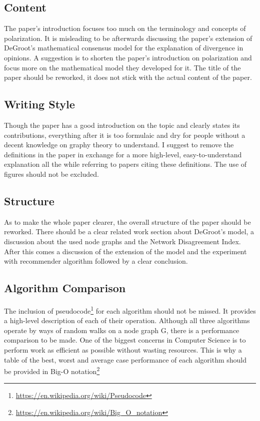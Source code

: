 \documentclass[14]{article}
\begin{document}
\subsection{Content}
The paper's introduction focuses too much on the terminology and concepts of polarization. It is misleading to be afterwards discussing the paper's extension of DeGroot's mathematical consensus model for the explanation of divergence in opinions. A suggestion is to shorten the paper's introduction on polarization and focus more on the mathematical model they developed for it. The title of the paper should be reworked, it does not stick with the actual content of the paper.

\subsection{Writing Style}
Though the paper has a good introduction on the topic and clearly states its contributions, everything after it is too formulaic and dry for people without a decent knowledge on graphy theory to understand. I suggest to remove the definitions in the paper in exchange for a more high-level, easy-to-understand explanation all the while referring to papers citing these definitions. The use of figures should not be excluded.

\subsection{Structure}
As to make the whole paper clearer, the overall structure of the paper should be reworked. There should be a clear related work section about DeGroot's model, a discussion about the used node graphs and the Network Disagreement Index. After this comes a discussion of the extension of the model and the experiment with recommender algorithm followed by a clear conclusion.

\subsection{Algorithm Comparison}
The inclusion of pseudocode\footnote{\protect\url{https://en.wikipedia.org/wiki/Pseudocode}} for each algorithm should not be missed. It provides a high-level description of each of their operation. Although all three algorithms operate by ways of random walks on a node graph G, there is a performance comparison to be made. One of the biggest concerns in Computer Science is to perform work as efficient as possible without wasting resources. This is why a table of the best, worst and average case performance of each algorithm should be provided in Big-O notation\footnote{\protect\url{https://en.wikipedia.org/wiki/Big\_O\_notation}}
\end{document}
